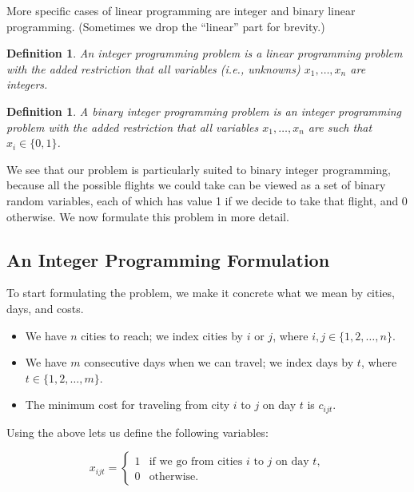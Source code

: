 \documentclass{article}
\newtheorem{defi}[thm]{Definition}
\begin{document}
More specific cases of linear programming are integer and binary linear programming. (Sometimes we drop the ``linear'' part for brevity.)

\begin{defi}\label{defi:integer_programming}
An \emph{integer programming problem} is a linear programming problem with the added restriction that all variables (i.e., unknowns) $x_1, \ldots,
x_n$ are integers.
\end{defi}

\begin{defi}\label{defi:binary_programming}
A \emph{binary integer programming problem} is an integer programming problem with the added restriction that all variables $x_1, \ldots,
x_n$ are such that $x_i \in \{0,1\}$.
\end{defi}

We see that our problem is particularly suited to binary integer programming, because all the possible flights we could take can be viewed as a set of
binary random variables, each of which has value 1 if we decide to take that flight, and 0 otherwise. We now formulate this problem in more detail.

\subsection{An Integer Programming Formulation}\label{sec:int_prog_form}

To start formulating the problem, we make it concrete what we mean by cities, days, and costs.

\begin{itemize}[noitemsep]
    \item We have $n$ cities to reach; we index cities by $i$ or $j$, where $i, j \in \{1, 2, \ldots, n\}$.
    \item We have $m$ consecutive days when we can travel; we index days by $t$, where $t \in \{1, 2, \ldots, m\}$.
    \item The minimum cost for traveling from city $i$ to $j$ on day $t$ is $c_{ijt}$.
\end{itemize}

Using the above lets us define the following variables:

\[
x_{ijt} = \begin{cases}
1 &\mbox{if we go from cities } i \mbox{ to } j \mbox{ on day } t, \\ 
0 & \mbox{otherwise}.
\end{cases}
\]
\end{document}
